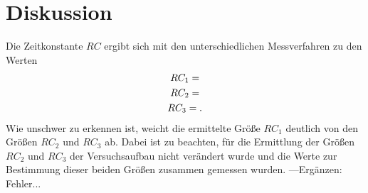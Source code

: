 \section{Diskussion}
\label{sec:Diskussion}
Die Zeitkonstante $RC$ ergibt sich mit den unterschiedlichen Messverfahren zu den Werten
\begin{gather}
    RC_{1} = \notag \\
    RC_{2} = \notag \\
    RC_{3} = \notag .
\end{gather}
Wie unschwer zu erkennen ist, weicht die ermittelte Größe $RC_{1}$ deutlich von den Größen
$RC_{2}$ und $RC_{3}$ ab. Dabei ist zu beachten, für die Ermittlung der Größen $RC_{2}$ und $RC_{3}$
der Versuchsaufbau nicht verändert wurde und die Werte zur Bestimmung dieser beiden Größen zusammen gemessen wurden.
---Ergänzen: Fehler... 
